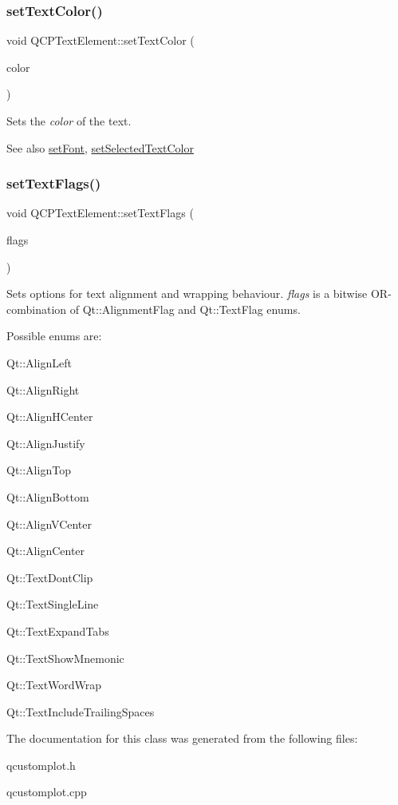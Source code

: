 \subsubsection{\texorpdfstring{set\+Text\+Color()}{setTextColor()}}
{\footnotesize\ttfamily void Q\+C\+P\+Text\+Element\+::set\+Text\+Color (\begin{DoxyParamCaption}\item[{const Q\+Color \&}]{color }\end{DoxyParamCaption})}

Sets the {\itshape color} of the text.

\begin{DoxySeeAlso}{See also}
\hyperlink{classQCPTextElement_a09b3241769528fa87cb4bf35c97defad}{set\+Font}, \hyperlink{classQCPTextElement_abaec200cae70a0eade53583defc0476d}{set\+Selected\+Text\+Color} 
\end{DoxySeeAlso}
\mbox{\label{classQCPTextElement_ab908f437f552020888a3ad8cf8242605}} 
\subsubsection{\texorpdfstring{set\+Text\+Flags()}{setTextFlags()}}
{\footnotesize\ttfamily void Q\+C\+P\+Text\+Element\+::set\+Text\+Flags (\begin{DoxyParamCaption}\item[{int}]{flags }\end{DoxyParamCaption})}

Sets options for text alignment and wrapping behaviour. {\itshape flags} is a bitwise O\+R-\/combination of {\ttfamily Qt\+::\+Alignment\+Flag} and {\ttfamily Qt\+::\+Text\+Flag} enums.

Possible enums are\+:
\begin{DoxyItemize}
\item Qt\+::\+Align\+Left
\item Qt\+::\+Align\+Right
\item Qt\+::\+Align\+H\+Center
\item Qt\+::\+Align\+Justify
\item Qt\+::\+Align\+Top
\item Qt\+::\+Align\+Bottom
\item Qt\+::\+Align\+V\+Center
\item Qt\+::\+Align\+Center
\item Qt\+::\+Text\+Dont\+Clip
\item Qt\+::\+Text\+Single\+Line
\item Qt\+::\+Text\+Expand\+Tabs
\item Qt\+::\+Text\+Show\+Mnemonic
\item Qt\+::\+Text\+Word\+Wrap
\item Qt\+::\+Text\+Include\+Trailing\+Spaces 
\end{DoxyItemize}

The documentation for this class was generated from the following files\+:\begin{DoxyCompactItemize}
\item 
qcustomplot.\+h\item 
qcustomplot.\+cpp\end{DoxyCompactItemize}
